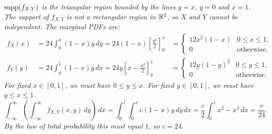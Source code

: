 \begin{solution}
\ben
\it %
$\text{supp}(f_{X,Y})$ is the triangular region bounded by the lines $y=x$, $y=0$ and $x=1$.
\it %
The support of $f_{X,Y}$ is not a rectangular region in $\mathbb{R}^2$, so $X$ and $Y$ cannot be independent.
\it %
The marginal PDFs are:
\[\begin{array}{lll}
f_X(x) 	
	& = 24\int_0^x (1-x)y\,dy 
	= 24(1-x)\left[\frac{y^2}{2}\right]_0^x 
	& = \begin{cases}
		12x^2(1-x) & 0\leq x\leq 1, \\
		0			& \text{otherwise.}
		\end{cases} \\[3ex]
f_Y(y) 	
	& = 24\int_y^1 (1-x)y\,dx 
	= 24y\left[x - \frac{x^2}{2}\right]_y^1 
	& = \begin{cases}
		12y(1-y)^2 & 0\leq y\leq 1, \\
		0			& \text{otherwise.}
		\end{cases}
\end{array}\]
\it %
\bit
\it For fixed $x\in[0,1]$, we must have $0\leq y\leq x$.
\it For fixed $y\in[0,1]$, we must have $y\leq x\leq 1$.
\eit
\[
\int_{-\infty}^{\infty}\left(\int_{-\infty}^{\infty}f_{X,Y}(x,y)\,dy\right)\,dx
	= \int_0^1\int_0^x c(1-x)y\,dy\,dx 
	= \frac{c}{2}\int_0^1 x^2-x^3\,dx
	= \frac{c}{24}.
\]
By the law of total probability this must equal $1$, so $c=24$.
\een
\end{solution}

